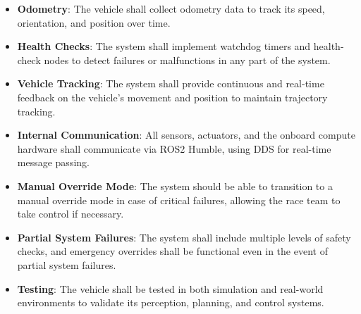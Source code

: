 \begin{itemize}
    \item \textbf{Odometry}: The vehicle shall collect odometry data to track its speed, orientation, and position over time.
    \item \textbf{Health Checks}: The system shall implement watchdog timers and health-check nodes to detect failures or malfunctions in any part of the system.
    \item \textbf{Vehicle Tracking}: The system shall provide continuous and real-time feedback on the vehicle's movement and position to maintain trajectory tracking.
    \item \textbf{Internal Communication}: All sensors, actuators, and the onboard compute hardware shall communicate via ROS2 Humble, using DDS for real-time message passing.
    \item \textbf{Manual Override Mode}: The system should be able to transition to a manual override mode in case of critical failures, allowing the race team to take control if necessary.
    \item \textbf{Partial System Failures}: The system shall include multiple levels of safety checks, and emergency overrides shall be functional even in the event of partial system failures.
    \item \textbf{Testing}: The vehicle shall be tested in both simulation and real-world environments to validate its perception, planning, and control systems.
\end{itemize}